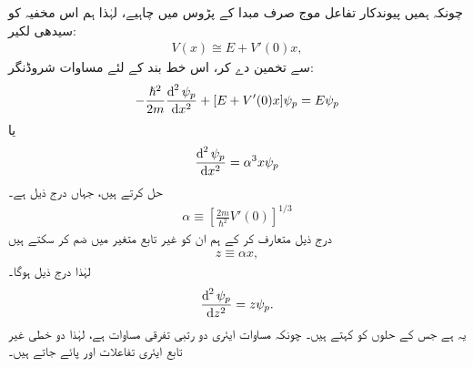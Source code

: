 چونکہ ہمیں پیوندکار تفاعل موج  صرف مبدا کے  پڑوس میں چاہیے،   لہٰذا ہم اس مخفیہ کو سیدھی لکیر: 
\begin{align}\label{مساوات_وقب_خط_بند_مخفیہ}
	V(x) \cong E + V'(0)x,
\end{align}
سے تخمین دے  کر،  اس خط بند   کے لئے مساوات شروڈنگر:
\begin{align*}
	-\frac{\hslash^{2}}{2m} \frac{\dif^{\,2}\psi_{p}}{\dif x^{2}} +[E+V'(0)x]\psi_{p}=E\psi_{p}
\end{align*}
یا 
\begin{align}
	\frac{\dif^{\,2} \psi_{p}}{\dif x^{2}} = \alpha^{3} x\psi_{p}
\end{align}
 حل کرتے ہیں، جہاں درج ذیل ہے۔
\begin{align}\label{مساوات_وقب_خط_بند_اور_مستقل}
	\alpha\equiv\left[\frac{2m}{\hslash^{2}} V'(0)\right]^{1/3}
\end{align}
درج ذیل متعارف کر کے ہم ان  کو غیر تابع متغیر میں ضم  کر سکتے ہیں
\begin{align}
	z\equiv\alpha x,
\end{align}
لہٰذا درج ذیل ہوگا۔
\begin{align}
	\frac{\dif^{\,2}\psi_{p}}{\dif z^{2}}=z\psi_{p}.
\end{align}
یہ   ہے جس کے حلوں کو  کہتے  ہیں۔  چونکہ مساوات ایئری دو رتبی تفرقی مساوات ہے،  لہٰذا دو خطی غیر تابع ایئری تفاعلات  اور  پائے جاتے ہیں۔

